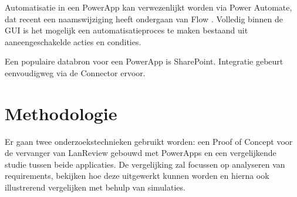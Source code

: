 Automatisatie in een PowerApp kan verwezenlijkt worden via Power Automate, dat recent een naamswijziging heeft ondergaan van Flow \parencite{Weare2019}. Volledig binnen de GUI is het mogelijk een automatisatieproces te maken bestaand uit aaneengeschakelde acties en condities.

Een populaire databron voor een PowerApp is SharePoint. Integratie gebeurt eenvoudigweg via de Connector ervoor. \parencite{Owen2019a}


\section{Methodologie}
\label{sec:methodologie}

Er gaan twee onderzoekstechnieken gebruikt worden: een Proof of Concept voor de vervanger van LanReview gebouwd met PowerApps en een vergelijkende studie tussen beide applicaties. De vergelijking zal focussen op analyseren van requirements, bekijken hoe deze uitgewerkt kunnen worden en hierna ook illustrerend vergelijken met behulp van simulaties.

\vspace{5mm}

